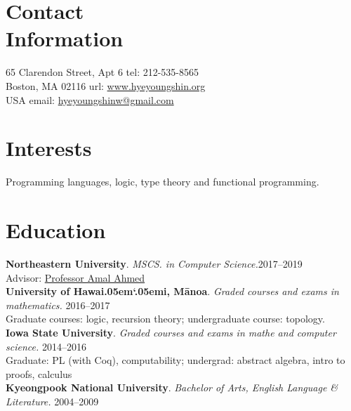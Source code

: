 \documentclass[margin,line]{resume}
\begin{document}
\newcommand{\Hawaii}{Hawai\kern.05em`\kern.05em\relax i}
\newcommand{\Manoa}{M\=anoa}

\begin{resume}

    \section{\mysidestyle Contact\\Information}
     65 Clarendon Street, Apt 6            \hfill tel: 212-535-8565\\
     Boston, MA 02116                 \hfill url: \href{https://hyeyoungshin.github.io/}{www.hyeyoungshin.org}\\
     USA  \hfill             \hfill email:  \href{mailto:hyeyoungshinw@gmail.com}{hyeyoungshinw@gmail.com}

    \section{\mysidestyle Interests}

    Programming languages, logic, type theory and functional programming.
    
    \section{\mysidestyle Education}

    \newcommand\mysmallskip{4pt}
    \newcommand\mymedskip{6pt}
    \newcommand\mybigskip{8pt}

    \textbf{Northeastern University}. \textsl{MSCS. in Computer Science.}\hfill 2017--2019\\
    Advisor: \href{http://www.ccs.neu.edu/home/amal/}{Professor Amal Ahmed}
    \\[\mymedskip]
    \textbf{University of \Hawaii, \Manoa}. \textsl{Graded courses and exams in mathematics.} \hfill 2016--2017\\  %
    Graduate courses: logic, recursion theory; undergraduate course: topology. %
    \\[\mymedskip]
    \textbf{Iowa State University}. \textsl{Graded courses and exams in mathe and computer science.} \hfill 2014--2016\\
    Graduate: PL {\small (with Coq)}, computability; undergrad: abstract algebra, intro to proofs, calculus %
    \\[\mymedskip] 
    \textbf{Kyeongpook National University}. \textsl{Bachelor of Arts, English Language \& Literature.} \hfill 2004--2009  %
    


\end{resume}
\end{document}
